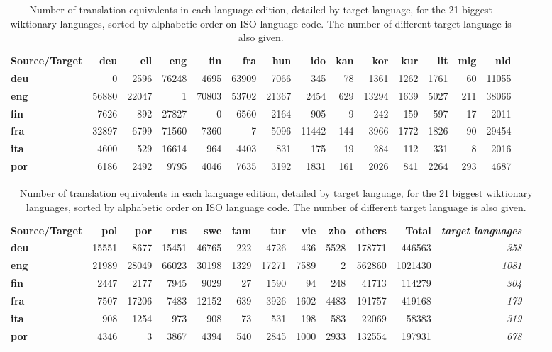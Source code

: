 \documentclass[sw]{iosart2c}
\begin{document}
\begin{table}[htb]
\begin{tabular}{lrrrrrrrrrrrrr}
\textbf{Source/Target} & \textbf{deu} & \textbf{ell} & \textbf{eng} & \textbf{fin} & \textbf{fra} & \textbf{hun} & \textbf{ido} & \textbf{kan} & \textbf{kor} & \textbf{kur} & \textbf{lit} & \textbf{mlg} & \textbf{nld}  \\
\textbf{deu} & 0 & 2596 & 76248 & 4695 & 63909 & 7066 & 345 & 78 & 1361 & 1262 & 1761 & 60 & 11055  \\
\textbf{eng} & 56880 & 22047 & 1 & 70803 & 53702 & 21367 & 2454 & 629 & 13294 & 1639 & 5027 & 211 & 38066 \\
\textbf{fin} & 7626 & 892 & 27827 & 0 & 6560 & 2164 & 905 & 9 & 242 & 159 & 597 & 17 & 2011 \\
\textbf{fra} & 32897 & 6799 & 71560 & 7360 & 7 & 5096 & 11442 & 144 & 3966 & 1772 & 1826 & 90 & 29454 \\
\textbf{ita} & 4600 & 529 & 16614 & 964 & 4403 & 831 & 175 & 19 & 284 & 112 & 331 & 8 & 2016 \\
\textbf{por} & 6186 & 2492 & 9795 & 4046 & 7635 & 3192 & 1831 & 161 & 2026 & 841 & 2264 & 293 & 4687 \\
\end{tabular}
\begin{tabular}{lrrrrrrrrrrrrr}
\textbf{Source/Target} & \textbf{pol} & \textbf{por} & \textbf{rus} & \textbf{swe} & \textbf{tam} & \textbf{tur} & \textbf{vie} & \textbf{zho}& \textbf{others} & \textbf{Total} & \textbf{\textit{target languages}}\\
\textbf{deu}  & 15551 & 8677 & 15451 & 46765 & 222 & 4726 & 436 & 5528 & 178771 & 446563 & \textit{358}\\
\textbf{eng}  & 21989 & 28049 & 66023 & 30198 & 1329 & 17271 & 7589 & 2 & 562860 & 1021430 & \textit{1081}\\
\textbf{fin} & 2447 & 2177 & 7945 & 9029 & 27 & 1590 & 94 & 248 & 41713 & 114279 & \textit{304}\\
\textbf{fra} & 7507 & 17206 & 7483 & 12152 & 639 & 3926 & 1602 & 4483 & 191757 & 419168 & \textit{179}\\
\textbf{ita} & 908 & 1254 & 973 & 908 & 73 & 531 & 198 & 583 & 22069 & 58383 & \textit{319}\\
\textbf{por} & 4346 & 3 & 3867 & 4394 & 540 & 2845 & 1000 & 2933 & 132554 & 197931 & \textit{678}\\

\end{tabular}
\caption{Number of translation equivalents in each language edition, detailed by target language, for the 21 biggest wiktionary languages, sorted by alphabetic order on ISO language code. The number of different target language is also given.}\label{tradsize}
\end{table}
\end{document}
